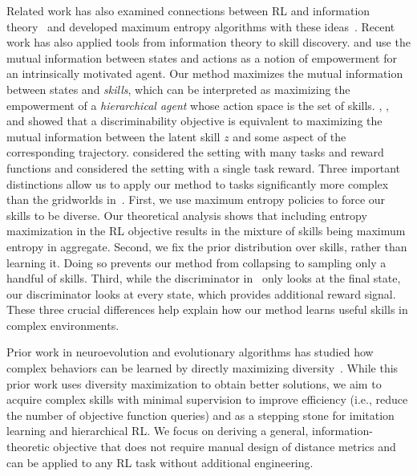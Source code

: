 \documentclass{article} %
\theoremstyle{questionstyle}\newtheorem{question}{Question}
\begin{document}
Related work has also examined connections between RL and information theory~\citep{ziebart2008maximum,schulman2017equivalence,nachum2017bridging, haarnoja2017reinforcement} and developed maximum entropy algorithms with these ideas~\cite{haarnoja2018soft, haarnoja2017reinforcement}.
Recent work has also applied tools from information theory to skill discovery.
\citet{mohamed2015variational} and \citet{jung2011empowerment} use the mutual information between states and actions as a notion of empowerment for an intrinsically motivated agent. Our method maximizes the mutual information between states and \emph{skills}, which can be interpreted as maximizing the empowerment of a \emph{hierarchical agent} whose action space is the set of skills.
 \citet{hausman2018learning}, \citet{florensa2017stochastic}, and \citet{gregor2016variational} showed that a discriminability objective is equivalent to maximizing the mutual information between the latent skill $z$ and some aspect of the corresponding trajectory.
\citet{hausman2018learning} considered the setting with many tasks and reward functions and \citet{florensa2017stochastic} considered the setting with a single task reward.
Three important distinctions allow us to apply our method to tasks significantly more complex than the gridworlds in~\citet{gregor2016variational}.
First, we use maximum entropy policies to force our skills to be diverse. Our theoretical analysis shows that including entropy maximization in the RL objective results in the mixture of skills being maximum entropy in aggregate.
Second, we fix the prior distribution over skills, rather than learning it. Doing so prevents our method from collapsing to sampling only a handful of skills.
Third, while the discriminator in~\citet{gregor2016variational} only looks at the final state, our discriminator looks at every state, which provides additional reward signal.
These three crucial differences help explain how our method learns useful skills in complex environments.

Prior work in neuroevolution and evolutionary algorithms has studied how complex behaviors can be learned by directly maximizing diversity~\citep{lehman2011abandoning,lehman2011evolving, woolley2011deleterious, stanley2002evolving, such2017deep, pugh2016quality, mouret2009overcoming}.
While this prior work uses diversity maximization to obtain better solutions, we aim to acquire complex skills with minimal supervision to improve efficiency (i.e., reduce the number of objective function queries) and as a stepping stone for imitation learning and hierarchical RL.
We focus on deriving a general, information-theoretic objective that does not require manual design of distance metrics and can be applied to any RL task without additional engineering.
\end{document}
